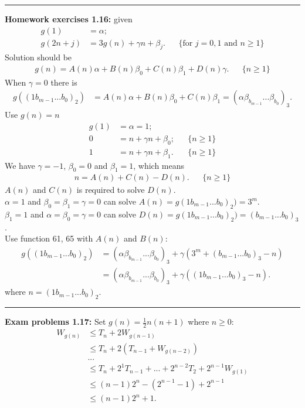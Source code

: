 \documentclass{article}
\begin{document}
\noindent\rule{\textwidth}{0.4pt}
\textbf{Homework exercises 1.16:}
given
\begin{align}
g(1) &= \alpha;\\
g(2n+j) &= 3g(n) + \gamma n + \beta_j. && \{\text{for }j=0,1\text{ and }n\ge 1\}
\end{align}
Solution should be
\begin{align}
g(n) = A(n)\alpha + B(n)\beta_0 + C(n)\beta_1 + D(n)\gamma. && \{n\ge 1\}
\end{align}
When $\gamma = 0$ there is 
\begin{align}
g((1b_{m-1}...b_0)_2) &= A(n)\alpha + B(n)\beta_0 + C(n)\beta_1 = (\alpha \beta_{b_{m-1}}...\beta_{b_0})_3.
\end{align}
Use $g(n) = n$
\begin{align}
g(1) &= \alpha = 1;\\
0 &= n + \gamma n + \beta_0; && \{n\ge 1\}\\
1 &= n + \gamma n + \beta_1. && \{n\ge 1\}
\end{align}
We have $\gamma = -1$, $\beta_0 = 0$ and $\beta_1 = 1$, which means
\begin{align}
n = A(n) + C(n) - D(n). && \{n\ge 1\}
\end{align}
$A(n)$ and $C(n)$ is required to solve $D(n)$.\\
$\alpha = 1$ and $\beta_0 = \beta_1 = \gamma = 0$ can solve $A(n) = g(1b_{m-1}...b_0)_2) = 3^m$.\\
$\beta_1 = 1$ and $\alpha = \beta_0 = \gamma = 0$ can solve $D(n) = g(1b_{m-1}...b_0)_2) = (b_{m-1}...b_0)_3$.\\
Use function 61, 65 with $A(n)$ and $B(n)$:
\begin{align}
g((1b_{m-1}...b_0)_2) &= (\alpha \beta_{b_{m-1}}...\beta_{b_0})_3 + \gamma (3^m + (b_{m-1}...b_0)_3 - n)\\
		      &= (\alpha \beta_{b_{m-1}}...\beta_{b_0})_3 + \gamma ((1b_{m-1}...b_0)_3 - n).
\end{align}
where $n = (1b_{m-1}...b_0)_2$.

\noindent\rule{\textwidth}{0.4pt}
\textbf{Exam problems 1.17:}
Set $g(n)=\frac{1}{2}n(n+1)$ where $n\ge 0$:
\begin{align}
W_{g(n)} & \le T_n + 2W_{g(n-1)} \\
	 & \le T_n + 2(T_{n-1} + W_{g(n-2)})\\
	 & ...\\
	 & \le T_n + 2^1T_{n-1} + ... + 2^{n-2}T_2 + 2^{n-1}W_{g(1)}\\
	 & \le (n-1)2^n - (2^{n-1}-1) + 2^{n-1}\\
	 & \le (n-1)2^n + 1.
\end{align}
\end{document}
